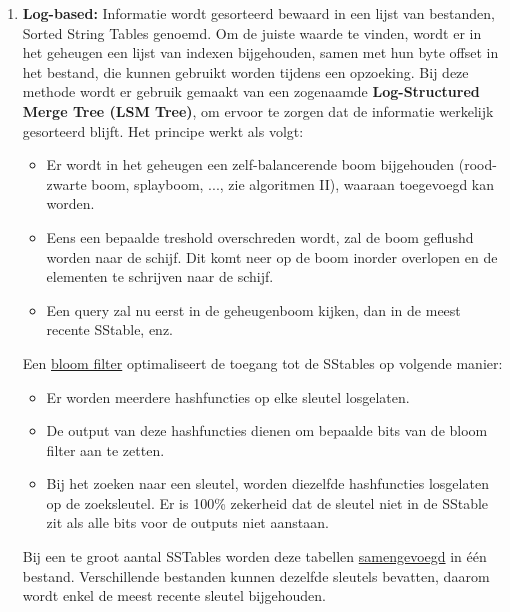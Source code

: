 \begin{enumerate}
		\item[\info] \textbf{Log-based:} Informatie wordt gesorteerd bewaard in een lijst van bestanden, Sorted String Tables genoemd. Om de juiste waarde te vinden, wordt er in het geheugen een lijst van indexen bijgehouden, samen met hun byte offset in het bestand, die kunnen gebruikt worden tijdens een opzoeking. Bij deze methode wordt er gebruik gemaakt van een zogenaamde \textbf{Log-Structured Merge Tree (LSM Tree)}, om ervoor te zorgen dat de informatie werkelijk gesorteerd blijft. Het principe werkt als volgt:
		\begin{itemize}
			\item[\info] Er wordt in het geheugen een zelf-balancerende boom bijgehouden (rood-zwarte boom, splayboom, ..., zie algoritmen II), waaraan toegevoegd kan worden.
			\item[\info] Eens een bepaalde treshold overschreden wordt, zal de boom geflushd worden naar de schijf. Dit komt neer op de boom inorder overlopen en de elementen te schrijven naar de schijf. 
			\item[\info] Een query zal nu eerst in de geheugenboom kijken, dan in de meest recente SStable, enz. 
		\end{itemize}
        Een \underline{bloom filter} optimaliseert de toegang tot de SStables op volgende manier:
        \begin{itemize}
            \item[\info] Er worden meerdere hashfuncties op elke sleutel losgelaten. 
            \item[\info] De output van deze hashfuncties dienen om bepaalde bits van de bloom filter aan te zetten. 
            \item[\info] Bij het zoeken naar een sleutel, worden diezelfde hashfuncties losgelaten op de zoeksleutel. Er is 100\% zekerheid dat de sleutel niet in de SStable zit als alle bits voor de outputs niet aanstaan. 
        \end{itemize}
        Bij een te groot aantal SSTables worden deze tabellen \underline{samengevoegd} in één bestand. Verschillende bestanden kunnen dezelfde sleutels bevatten, daarom wordt enkel de meest recente sleutel bijgehouden.


\end{enumerate}
